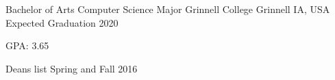\documentclass[11pt, a4paper]{awesome-cv}
\begin{document}
\makecvheader


\begin{cventries}
  \cventry
    {Bachelor of Arts Computer Science Major}
    {Grinnell College}
    {Grinnell IA, USA}
    {Expected Graduation 2020}
    {
      \begin{cvitems}
        \item{GPA: 3.65}
        \item {Deans list Spring and Fall 2016}
      \end{cvitems}
    }
\end{cventries}

\end{document}
